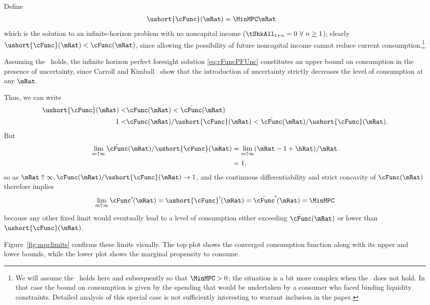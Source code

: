 \documentclass[BufferStockTheory]{subfiles}
\begin{document}
Define
\begin{align*}
  \ushort{\cFunc}(\mRat)  & = \MinMPC \mRat
\end{align*}
which is the solution to an infinite-horizon problem with no noncapital
income
($\tShkAll_{t+n} = 0~\forall~n\geq1$); 
clearly $\ushort{\cFunc}(\mRat)
< \cFunc(\mRat)$, since allowing the possibility of future noncapital
income cannot reduce current consumption.\footnote{We will assume the
  \RIC~holds here and subsequently so that $\MinMPC > 0$; the situation
  is a bit more complex when the \RIC~does not hold.   In that case the bound on consumption is given by the spending
  that would be undertaken by a consumer who faced binding liquidity
  constraints.  Detailed analysis of this special case is not
  sufficiently interesting to warrant inclusion in the paper.}

Assuming the \FHWC~holds, the infinite horizon perfect
foresight solution \eqref{eq:cFuncPFUnc} constitutes an upper
bound on consumption in the presence of uncertainty, since Carroll and
Kimball~\citeyearpar{ckConcavity} show that the introduction of
uncertainty strictly decreases the level of consumption at any $\mRat$.

Thus, we can write
\begin{align}  
  \ushort{\cFunc}(\mRat) < & \cFunc(\mRat)  < \bar{\cFunc}(\mRat) \label{eq:lowerltupper} \\
  1 < & \cFunc(\mRat)/\ushort{\cFunc}(\mRat)  < \bar{\cFunc}(\mRat)/\ushort{\cFunc}(\mRat). \nonumber
\end{align}
But
\begin{align*}  \label{eq:limitlowerupper}
  \lim_{m \uparrow \infty} \bar{\cFunc}(\mRat)/\ushort{\cFunc}(\mRat) 
  & = \lim_{m \uparrow \infty} (\mRat -1+ \hRat)/\mRat  \\
  & = 1, 
\end{align*}
so as $\mRat \uparrow \infty, \cFunc(\mRat)/\ushort{\cFunc}(\mRat)
\rightarrow 1$, and the continuous differentiability and strict
concavity of $\cFunc(\mRat)$ therefore implies
\begin{equation*}  \label{eq:limxtoinftycp}
  \lim_{m \uparrow \infty} \cFunc^{\prime}(\mRat) =
  \ushort{\cFunc}^{\prime}(\mRat) = \bar{\cFunc}^{\prime}(\mRat) = \MinMPC 
\end{equation*}
because any other fixed limit would eventually lead to a level of
consumption either exceeding $\bar{\cFunc}(\mRat)$ or lower than
$\ushort{\cFunc}(\mRat)$.

Figure~\ref{fig:mpclimits} confirms these limits visually.  The top
plot shows the converged consumption function along with its upper and lower bounds,
while the lower plot shows the marginal propensity to consume.
\renewcommand{\figFile}{mpclimits}
\hypertarget{\figFile}{}

\end{document}
